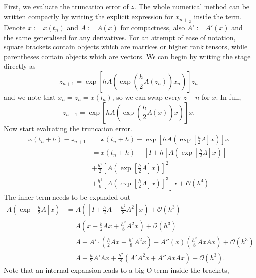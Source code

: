 First, we evaluate the truncation error of $z$. The whole numerical method can be written compactly by writing the explicit expression for $x_{n+\frac{1}{2}}$ inside the term.
Denote $x := x(t_n)$ and $A := A(x)$ for compactness, also $A' := A'(x)$ and the same generalised for any derivatives.
For an attempt of ease of notation, square brackets contain objects which are matrices or higher rank tensors, while parentheses contain objects which are vectors.
We can begin by writing the stage directly as
\begin{equation*}
    z_{n+1} = \exp \left[ h A \left( \exp \left( \frac{h}{2} A(z_n) \right) x_n \right) \right] z_n
\end{equation*}
and we note that $x_n = z_n = x(t_n)$, so we can swap every $z+n$ for $x$.
In full,
\begin{equation}
    z_{n+1} = \exp \left[ h A \left( \exp \left( \frac{h}{2} A(x) \right) x \right) \right] x.
    \label{eqn:strangz}
\end{equation}
Now start evaluating the truncation error.
\begin{align*}
    x(t_n + h) - z_{n+1} &= x(t_n+h) - \exp \left[ h A \left( \exp \left[ \frac{h}{2}A \right]x \right) \right]x \\
    &= x(t_n + h) - \left[
        I + h \left[ A \left( \exp \left[ \frac{h}{2}A \right]x \right) \right] \right. \\
        &+ \frac{h^2}{2} \left[ A \left( \exp \left[ \frac{h}{2}A \right]x \right) \right]^2 \\
        &+ \frac{h^3}{6} \left. \left[ A \left( \exp \left[ \frac{h}{2}A \right]x \right) \right]^3
    \right]x + \mathcal{O}(h^4).
\end{align*}
The inner term needs to be expanded out
\begin{align*}
    A\left( \exp \left[ \frac{h}{2}A \right]x \right) &= A \left( \left[ I + \frac{h}{2}A + \frac{h^2}{8}A^2 \right]x \right) + \mathcal{O}(h^3) \\
    &= A\left( x + \frac{h}{2}Ax + \frac{h^2}{8}A^2 x \right) + \mathcal{O}(h^3) \\
    &= A + A' \cdot \left( \frac{h}{2} Ax + \frac{h^2}{8} A^2 x \right) + A''(x) \left( \frac{h^2}{8}AxAx \right) + \mathcal{O}(h^3) \\
    &= A + \frac{h}{2}A'Ax + \frac{h^2}{8} \left( A' A^2 x + A'' Ax Ax \right) + \mathcal{O}(h^3).
\end{align*}
Note that an internal expansion leads to a big-O term inside the brackets,
